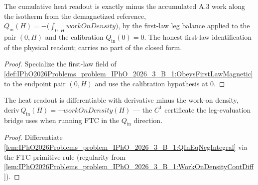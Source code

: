 \begin{lemma}
\label{lem:IPhO2026Problems_problem_IPhO_2026_3_B_1:QInEqNegIntegral}
The cumulative heat readout is exactly minus the accumulated A.3 work
along the isotherm from the demagnetized reference,
$Q_{\mathrm{in}}(H) =
-\bigl(\int_{0..H} \mathit{workOnDensity}\bigr)$, by the first-law leg
balance applied to the pair $(0, H)$ and the calibration
$Q_{\mathrm{in}}(0) = 0$.  The honest first-law identification of the
physical readout; carries no part of the closed form.
\end{lemma}
\begin{proof}
Specialize the first-law field of
\cref{def:IPhO2026Problems_problem_IPhO_2026_3_B_1:ObeysFirstLawMagnetic}
to the endpoint pair $(0, H)$ and use the calibration hypothesis at $0$.
\end{proof}

\begin{lemma}
\label{lem:IPhO2026Problems_problem_IPhO_2026_3_B_1:QInDeriv}
The heat readout is differentiable with derivative minus the work-on
density, $\mathrm{deriv}\,Q_{\mathrm{in}}(H) =
-\mathit{workOnDensity}(H)$ --- the $C^1$ certificate the leg-evaluation
bridge uses when running FTC in the $Q_{\mathrm{in}}$ direction.
\end{lemma}
\begin{proof}
Differentiate
\cref{lem:IPhO2026Problems_problem_IPhO_2026_3_B_1:QInEqNegIntegral}
via the FTC primitive rule (regularity from
\cref{lem:IPhO2026Problems_problem_IPhO_2026_3_B_1:WorkOnDensityContDiff}).
\end{proof}

